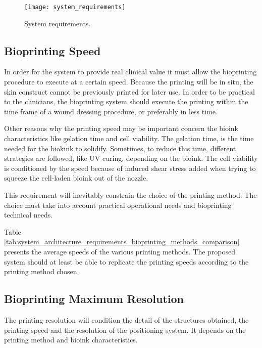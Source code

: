 \begin{figure}[htbp]
	\centering
	\texttt{[image: system\_requirements]}
	\caption{System requirements.}
	\label{fig:system_requirements}
\end{figure}

\subsection{Bioprinting Speed}
\label{subsec:system_architecture_requirements_bioprinting_speed}

In order for the system to provide real clinical value it must allow the bioprinting procedure to execute at a certain speed. Because the printing will be in situ, the skin construct cannot be previously printed for later use. In order to be practical to the clinicians, the bioprinting system should execute the printing within the time frame of a wound dressing procedure, or preferably in less time.

Other reasons why the printing speed may be important concern the bioink characteristics like gelation time and cell viability. The gelation time, is the time needed for the biokink to solidify. Sometimes, to reduce this time, different strategies are followed, like UV curing, depending on the bioink. The cell viability is conditioned by the speed because of induced shear stress added when trying to squeeze the cell-laden bioink out of the nozzle. 

This requirement will inevitably constrain the choice of the printing method. The choice must take into account practical operational needs and bioprinting technical needs.

Table \ref{tab:system_architecture_requirements_bioprinting_methods_comparison} presents the average speeds of the various printing methods. The proposed system should at least be able to replicate the printing speeds according to the printing method chosen.


\subsection{Bioprinting Maximum Resolution}
\label{subsec:system_architecture_requirements_bioprinting_max_resolution}

The printing resolution will condition the detail of the structures obtained, the printing speed and the resolution of the positioning system. It depends on the printing method and bioink characteristics.

